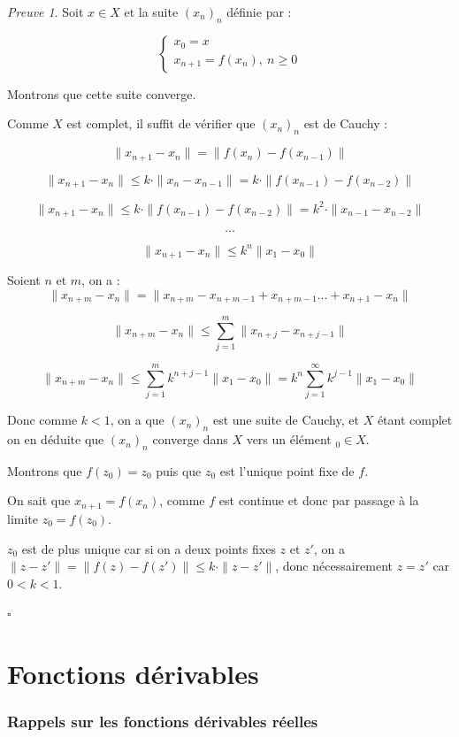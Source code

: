 \documentclass[]{article}
\theoremstyle{remark}
\newtheorem{myproof}{Preuve}
\theoremstyle{definition}
\newcommand{\cqfd}{
	\hfill$\square$
}
\begin{document}
\begin{myproof}
	Soit $x \in X$ et la suite $(x_n)_n$ définie par :
	
	$$\left\{
		\begin{array}{l}
			x_0 = x \\
			x_{n+1} = f(x_n), ~ n \geqslant 0
		\end{array}
	\right.$$
	
	Montrons que cette suite converge.
	
	Comme $X$ est complet, il suffit de vérifier que $(x_n)_n$ est de Cauchy :
	
	$$\|x_{n+1} - x_n\| = \|f(x_n) - f(x_{n-1})\|$$
	
	$$\|x_{n+1} - x_n\| \leqslant k \cdot\|x_n - x_{n-1}\| = k \cdot \|f(x_{n-1}) - f(x_{n-2})\|$$
	
	$$\|x_{n+1} - x_n\| \leqslant k \cdot \|f(x_{n-1}) - f(x_{n-2})\| = k^2 \cdot \|x_{n-1} - x_{n-2}\|$$
	
	$$...$$
	
	$$\|x_{n+1}-x_n\| \leqslant k^n \|x_1 - x_0\|$$
	
	Soient $n$ et $m$, on a : $$\|x_{n+m} - x_n\| = \|x_{n+m} - x_{n+m-1} + x_{n+m-1} ... + x_{n+1} - x_n\|$$
	
	$$\|x_{n+m} - x_n\| \leqslant \sum_{j = 1}^{m} \|x_{n+j} - x_{n+j-1}\|$$
	
	$$\|x_{n+m} - x_n\| \leqslant \sum_{j = 1}^{m} k^{n+j-1}\|x_1 - x_0\| = k^n \sum_{j=1}^{\infty} k^{j-1} \|x_1 - x_0\|$$

	Donc comme $k < 1$, on a que $(x_n)_n$ est une suite de Cauchy, et $X$ étant complet on en déduite que $(x_n)_n$ converge dans $X$ vers un élément $_0 \in X$.
	
	Montrons que $f(z_0)=z_0$ puis que $z_0$ est l'unique point fixe de $f$.
	
	On sait que $x_{n+1} = f(x_n)$, comme $f$ est continue et donc par passage à la limite $z_0 = f(z_0)$.
	
	$z_0$ est de plus unique car si on a deux points fixes $z$ et $z'$, on a $\|z-z'\|=\|f(z)-f(z')\| \leqslant k \cdot \|z-z'\|$, donc nécessairement $z=z'$ car $0 < k < 1$.
	
	\cqfd
\end{myproof}

\part{Fonctions dérivables}

\section{Rappels sur les fonctions dérivables réelles}
\end{document}
